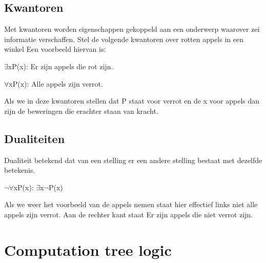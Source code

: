 \documentclass{article}%
\begin{document}
\subsection{Kwantoren}
Met kwantoren worden eigenschappen gekoppeld aan een onderwerp waarover zei informatie verschaffen. Stel de volgende kwantoren over rotten appels in een winkel
Een voorbeeld hiervan is:
\begin{description}
\item $\exists$xP(x): Er zijn appels die rot zijn.
\item $\forall$xP(x): Alle appels zijn verrot.
\end{description}
Als we in deze kwantoren stellen dat P staat voor verrot en de x voor appels dan zijn de beweringen die erachter staan van kracht.


\subsection{Dualiteiten}
Dualiteit betekend dat van een stelling er een andere stelling bestaat met dezelfde betekenis.
\begin{center}
$\neg\forall$xP(x): $\exists$x$\neg$P(x)
\end{center}

Als we weer het voorbeeld van de appels nemen staat hier effectief links niet alle appels zijn verrot. Aan de rechter kant staat Er zijn appels die niet verrot zijn.

\section{Computation tree logic}

\end{document}
